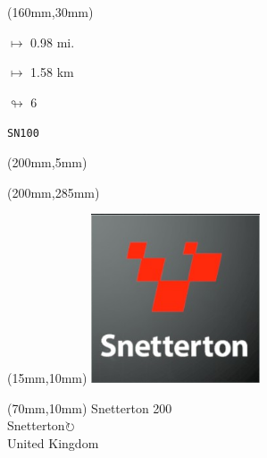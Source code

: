 \begin{textblock*}{40mm}(160mm,30mm)%
\Large
\par$\mapsto$ 0.98 mi.
\par$\mapsto$ 1.58 km
\par$\looparrowright$ 6
\par\hfill\tiny\tt SN100\\
\end{textblock*}
\begin{textblock*}{20mm}(200mm,5mm)%
\fbox{\thepage}
\label{SN100}
\end{textblock*}
\begin{textblock*}{20mm}(200mm,285mm)%
\fbox{\thepage}
\end{textblock*}

\null\newpage
\begin{textblock*}{50mm}(15mm,10mm)%
\includegraphics[width=50mm]{LG/2015-05-20_00095.png}
\end{textblock*}
\begin{textblock*}{130mm}(70mm,10mm)%
{\fontsize{20}{20}\selectfont Snetterton 200\\}
{\fontsize{16}{16}\selectfont Snetterton\hfill \Large$\circlearrowright$\\}
{\fontsize{12}{12}\selectfont United Kingdom\\}
\end{textblock*}
